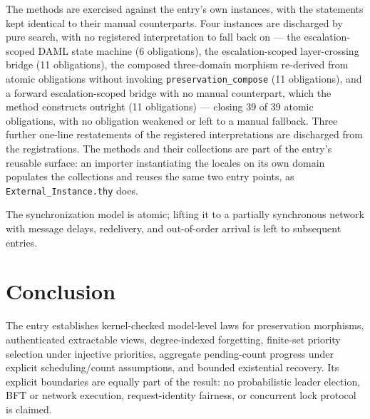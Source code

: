 \documentclass[11pt,a4paper]{article}
\begin{document}
The methods are exercised against the entry's own instances, with the
statements kept identical to their manual counterparts.  Four instances are
discharged by pure search, with no registered interpretation to fall back
on --- the escalation-scoped DAML state machine (6 obligations), the
escalation-scoped layer-crossing bridge (11 obligations), the composed
three-domain morphism re-derived from atomic obligations without invoking
\texttt{preservation\_compose} (11 obligations), and a forward
escalation-scoped bridge with no manual counterpart, which the method
constructs outright (11 obligations) --- closing 39 of 39 atomic
obligations, with no obligation weakened or left to a manual fallback.
Three further one-line restatements of the registered interpretations are
discharged from the registrations.  The methods and their collections are
part of the entry's reusable surface: an importer instantiating the locales
on its own domain populates the collections and reuses the same two entry
points, as \texttt{External\_Instance.thy} does.

The synchronization model is atomic; lifting it to a partially synchronous
network with message delays, redelivery, and out-of-order arrival is left
to subsequent entries.



\section{Conclusion}

The entry establishes kernel-checked model-level laws for preservation
morphisms, authenticated extractable views, degree-indexed forgetting,
finite-set priority selection under injective priorities, aggregate
pending-count progress under explicit scheduling/count assumptions, and
bounded existential recovery.  Its explicit boundaries are equally part of the
result: no probabilistic leader election, BFT or network execution,
request-identity fairness, or concurrent lock protocol is claimed.



\end{document}
